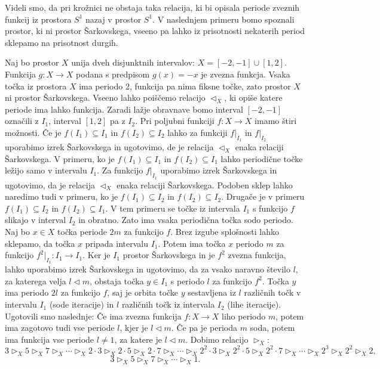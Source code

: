 \documentclass[../TG_magistrsko_delo_sections.tex]{subfiles}
\begin{document}
Videli smo, da pri krožnici ne obstaja taka relacija, ki bi opisala periode zveznih funkcij iz prostora $S^1$ nazaj v prostor $S^1$. V naslednjem primeru bomo spoznali prostor, ki ni prostor Šarkovskega, vseeno pa lahko iz prisotnosti nekaterih period sklepamo na prisotnost durgih.
\begin{primer}
Naj bo prostor $X$ unija dveh disjunktnih intervalov: $X = [-2, -1] \cup [1, 2]$. Funkcija $g : X \to X$ podana s predpisom $g(x) = -x$ je zvezna funkcja. Vsaka točka iz prostora $X$ ima periodo 2, funkcija pa nima fiksne točke, zato prostor $X$ ni prostor Šarkovskega. Vseeno lahko poiščemo relacijo $\triangleleft_X$, ki opiše katere periode ima lahko funkcija. Zaradi lažje obravnave bomo interval $[-2, -1]$ označili z $I_1$, interval $[1, 2]$ pa z $I_2$. Pri poljubni funkciji $f: X \to X$ imamo štiri možnosti. Če je $f(I_1) \subseteq I_1$ in $f(I_2) \subseteq I_2$ lahko za funkciji $f|_{I_1}$ in $f|_{I_2}$ uporabimo izrek Šarkovskega in ugotovimo, de je relacija $\triangleleft_X$ enaka relaciji Šarkovskega. V primeru, ko je $f(I_1) \subseteq I_1$ in $f(I_2) \subseteq I_1$ lahko periodične točke ležijo samo v intervalu $I_1$. Za funkcijo $f|_{I_1}$ uporabimo izrek Šarkovskega in ugotovimo, da je relacija $\triangleleft_X$ enaka relaciji Šarkovskega. Podoben sklep lahko naredimo tudi v primeru, ko je $f(I_1) \subseteq I_2$ in $f(I_2) \subseteq I_2$. Drugače je v primeru $f(I_1) \subseteq I_2$ in $f(I_2) \subseteq I_1$. V tem primeru se točke iz intervala $I_1$ s funkcijo $f$ slikajo v interval $I_2$ in obratno. Zato ima vsaka periodična točka sodo periodo. Naj bo $x \in X$ točka periode $2m$ za funkcijo $f$. Brez izgube splošnosti lahko sklepamo, da točka $x$ pripada intervalu $I_1$. Potem ima točka $x$ periodo $m$ za funkcijo $f^2|_{I_1} :I_1 \to I_1$. Ker je $I_1$ prostor Šarkovskega in je $f^2$ zvezna funkcija, lahko uporabimo izrek Šarkovskega in ugotovimo, da za vsako naravno število $l$, za katerega velja $l \triangleleft m$, obstaja točka $y \in I_1$ s periodo $l$ za funkcijo $f^2$. Točka $y$ ima periodo $2l$ za funkcijo $f$, saj je orbita točke $y$ sestavljena iz $l$ različnih točk v intervalu $I_1$ (sode iteracije) in $l$ različnih točk iz intervala $I_2$ (lihe iteracije). 
Ugotovili smo naslednje: Če ima zvezna funkcija $f:X \to X$ liho periodo $m$, potem ima zagotovo tudi vse periode $l$, kjer je $l \triangleleft m$. Če pa je perioda $m$ soda, potem ima funkcija vse periode $l\neq1$, za katere je $l \triangleleft m$. 
Dobimo relacijo $\triangleright_X$:
$$3 \triangleright_X 5 \triangleright_X 7 \triangleright_X \cdots \triangleright_X 2\cdot 3 \triangleright_X 2\cdot 5 \triangleright_X 2\cdot 7 \triangleright_X \cdots \triangleright_X 2^2\cdot 3 \triangleright_X 2^2\cdot 5 \triangleright_X 2^2\cdot 7 \triangleright_X \cdots \triangleright_X 2^3 \triangleright_X 2^2 \triangleright_X 2,$$
$$3 \triangleright_X 5 \triangleright_X 7 \triangleright_X \cdots \triangleright_X 1.$$
\end{primer}
\end{document}
